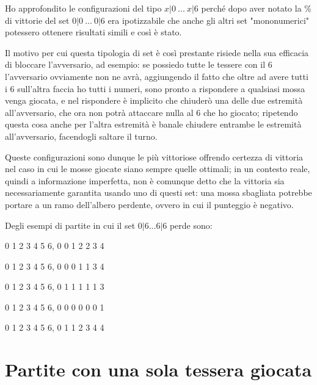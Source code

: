 \documentclass[a4paper,12pt]{report}
\begin{document}
Ho approfondito le configurazioni del tipo \(x|0\ ...\ x|6\) perché dopo aver notato la \% di vittorie del set \(0|0\ ...\ 0|6\) era ipotizzabile che anche gli altri set "mononumerici" potessero ottenere risultati simili e così è stato.

Il motivo per cui questa tipologia di set è così prestante risiede nella sua efficacia di bloccare l'avversario, ad esempio: se possiedo tutte le tessere con il 6 l'avversario ovviamente non ne avrà, aggiungendo il fatto che oltre ad avere tutti i 6 sull'altra faccia ho tutti i numeri, sono pronto a rispondere a qualsiasi mossa venga giocata, e nel rispondere è implicito che chiuderò una delle due estremità all'avversario, che ora non potrà attaccare nulla al 6 che ho giocato; ripetendo questa cosa anche per l'altra estremità è banale chiudere entrambe le estremità all'avversario, facendogli saltare il turno.

Queste configurazioni sono dunque le più vittoriose offrendo certezza di vittoria nel caso in cui le mosse giocate siano sempre quelle ottimali; in un contesto reale, quindi a informazione imperfetta, non è comunque detto che la vittoria sia necessariamente garantita usando uno di questi set: una mossa sbagliata potrebbe portare a un ramo dell'albero perdente, ovvero in cui il punteggio è negativo.

Degli esempi di partite in cui il set \( 0|6 ... 6|6\) perde sono:

0 1 2 3 4 5 6, 0 0 1 2 2 3 4

0 1 2 3 4 5 6, 0 0 0 1 1 3 4 

0 1 2 3 4 5 6, 0 1 1 1 1 1 3 

0 1 2 3 4 5 6, 0 0 0 0 0 0 1  

0 1 2 3 4 5 6, 0 1 1 2 3 4 4 


\section{Partite con una sola tessera giocata}
\end{document}
